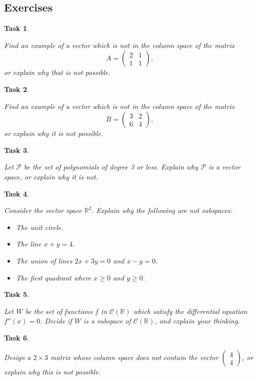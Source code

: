 \documentclass[10pt,]{book}
\theoremstyle{plain}
\numberwithin{equation}{section}
\newtheorem{task}{Task}[chapter]
\begin{document}
\subsection[Exercises]{Exercises}\label{subsection-62}
\begin{task}
\label{task-82}

        Find an example of a vector which is not in the column space of the
        matrix \[
        A = \begin{pmatrix} 2 & 1  \\ 1 & 1 \end{pmatrix},
        \] or explain why that is not possible.
      \end{task}
\begin{task}
\label{task-83}

        Find an example of a vector which is not in the column space of the
        matrix \[
        B = \begin{pmatrix} 3 & 2 \\ 6 & 4 \end{pmatrix},
        \] or explain why it is not possible.
      \end{task}
\begin{task}
\label{task-84}

        Let \(\mathcal{P}\) be the set of polynomials of degree 3 or less.
        Explain why \(\mathcal{P}\) is a vector space, or explain why it is not.
      \end{task}
\begin{task}
\label{task-85}

        Consider the vector space \(\mathbb{R}^2\). Explain why the following
        are not subspaces:
        \begin{itemize}
\item{}The unit circle.\item{}The line \(x+y = 4\).\item{}The union of lines \(2x+3y = 0\) and \(x-y=0\).\item{}The first quadrant where \(x\geq 0\) and \(y\geq 0\).\end{itemize}
\end{task}
\begin{task}
\label{task-86}

        Let \(W\) be the set of functions \(f\) in
        \(\mathcal{C}(\mathbb{R})\) which satisfy the differential equation
        \(f''(x) = 0\). Decide if \(W\) is a subspace of
        \(\mathcal{C}(\mathbb{R})\), and explain your thinking.
      \end{task}
\begin{task}
\label{task-87}

        Design a \(2\times 3\) matrix whose column space does not contain the
        vector \(\begin{pmatrix} 4 \\ 4 \end{pmatrix}\), or explain why this is
        not possible.
      \end{task}
\clearpage
\typeout{************************************************}
\typeout{************************************************}
\end{document}
